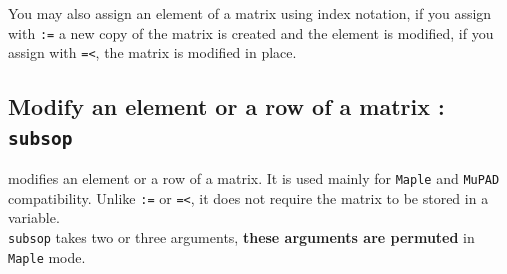 \documentclass[a4paper,11pt]{book}
\begin{document}
You may also assign an element of a matrix using index notation,
if you assign with {\tt :=} a new copy of the matrix is created
and the element is modified, if you assign with {\tt =<},
the matrix is modified in place.

\subsection{Modify an element or a row of a matrix : {\tt subsop}}
 modifies an element or a row of a matrix.
It is used mainly for {\tt Maple} and {\tt MuPAD} compatibility.
Unlike {\tt :=} or {\tt =<},
it does not require the matrix to be stored in a variable.\\
{\tt subsop} takes two or three arguments,
{\bf these arguments are permuted} in {\tt Maple} mode.
\end{document}
